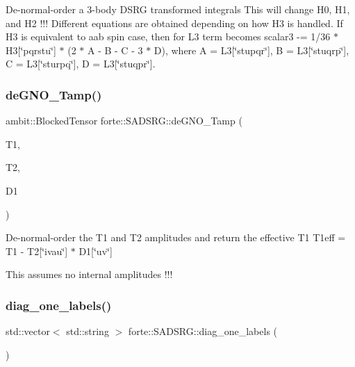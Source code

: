 De-\/normal-\/order a 3-\/body D\+S\+RG transformed integrals This will change H0, H1, and H2 !!! Different equations are obtained depending on how H3 is handled. If H3 is equivalent to aab spin case, then for L3 term becomes scalar3 -\/= 1/36 $\ast$ H3\mbox{[}\char`\"{}pqrstu\char`\"{}\mbox{]} $\ast$ (2 $\ast$ A -\/ B -\/ C -\/ 3 $\ast$ D), where A = L3\mbox{[}\char`\"{}stupqr\char`\"{}\mbox{]}, B = L3\mbox{[}\char`\"{}stuqrp\char`\"{}\mbox{]}, C = L3\mbox{[}\char`\"{}sturpq\char`\"{}\mbox{]}, D = L3\mbox{[}\char`\"{}stuqpr\char`\"{}\mbox{]}.\mbox{\label{classforte_1_1_s_a_d_s_r_g_a3441652004bce10f0d44003821814a3a}} 
\subsubsection{\texorpdfstring{de\+G\+N\+O\+\_\+\+Tamp()}{deGNO\_Tamp()}}
{\footnotesize\ttfamily ambit\+::\+Blocked\+Tensor forte\+::\+S\+A\+D\+S\+R\+G\+::de\+G\+N\+O\+\_\+\+Tamp (\begin{DoxyParamCaption}\item[{Blocked\+Tensor \&}]{T1,  }\item[{Blocked\+Tensor \&}]{T2,  }\item[{Blocked\+Tensor \&}]{D1 }\end{DoxyParamCaption})\hspace{0.3cm}{\ttfamily [protected]}}

De-\/normal-\/order the T1 and T2 amplitudes and return the effective T1 T1eff = T1 -\/ T2\mbox{[}\char`\"{}ivau\char`\"{}\mbox{]} $\ast$ D1\mbox{[}\char`\"{}uv\char`\"{}\mbox{]}

This assumes no internal amplitudes !!! \mbox{\label{classforte_1_1_s_a_d_s_r_g_ae64cb65cf45e0f382e1065fad5437993}} 
\subsubsection{\texorpdfstring{diag\+\_\+one\+\_\+labels()}{diag\_one\_labels()}}
{\footnotesize\ttfamily std\+::vector$<$ std\+::string $>$ forte\+::\+S\+A\+D\+S\+R\+G\+::diag\+\_\+one\+\_\+labels (\begin{DoxyParamCaption}{ }\end{DoxyParamCaption})\hspace{0.3cm}{\ttfamily [protected]}}




